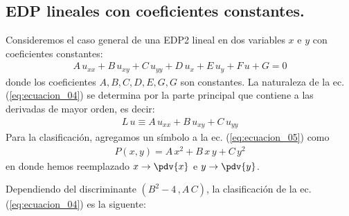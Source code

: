 \subsection{EDP lineales con coeficientes constantes.}
Consideremos el caso general de una EDP2 lineal en dos variables $x$ e $y$ con coeficientes constantes:
\begin{align}
A \, u_{xx} + B \, u_{xy} + C \, u_{yy} + D \, u_{x} + E \, u_{y} + F \, u + G = 0
\label{eq:ecuacion_04}    
\end{align}
donde los coeficientes $A, B, C, D, E, G, G$ son constantes. La naturaleza de la ec. (\ref{eq:ecuacion_04}) se determina por la parte principal que contiene a las derivadas de mayor orden, es decir:
\begin{align}
L \, u \equiv A \, u_{xx} + B \, u_{xy} + C \, u_{yy}
\label{eq:ecuacion_05}    
\end{align}
Para la clasificación, agregamos un símbolo a la ec. (\ref{eq:ecuacion_05}) como
\begin{align*}
P(x, y) = A \, x^{2} + B \, x \, y + C \, y^{2}
\end{align*}
en donde hemos reemplazado $x \to \displaystyle \pdv{x}$ e $y \to \displaystyle \pdv{y}$.
\par
Dependiendo del discriminante $(B^{2} - 4\, , A \, C)$, la clasificación de la ec. (\ref{eq:ecuacion_04}) es la siguente:
\begin{center}
\end{center}
